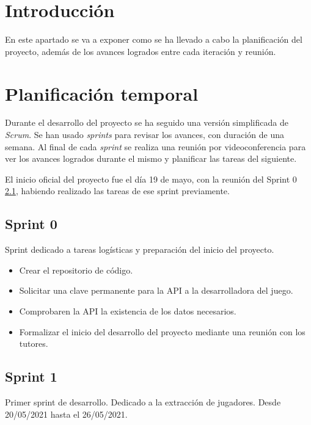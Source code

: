 
\section{Introducción}

En este apartado se va a exponer como se ha llevado a cabo la planificación del proyecto, además de los avances logrados entre cada iteración y reunión.

\section{Planificación temporal}

Durante el desarrollo del proyecto se ha seguido una versión simplificada de \textit{Scrum}. Se han usado \textit{sprints} para revisar los avances, con duración de una semana. Al final de cada \textit{sprint} se realiza una reunión por videoconferencia para ver los avances logrados durante el mismo y planificar las tareas del siguiente.

El inicio oficial del proyecto fue el día 19 de mayo, con la reunión del Sprint 0 \ref{sprint-0}, habiendo realizado las tareas de ese sprint previamente.

\subsection{Sprint 0}\label{sprint-0}

Sprint dedicado a tareas logísticas y preparación del inicio del proyecto.

\begin{itemize}
    \item Crear el repositorio de código.
    \item Solicitar una clave permanente para la API a la desarrolladora del juego.
    \item Comprobaren la API la existencia de los datos necesarios.
    \item Formalizar el inicio del desarrollo del proyecto mediante una reunión con los tutores.
\end{itemize}

\subsection{Sprint 1}

Primer sprint de desarrollo. Dedicado a la extracción de jugadores. Desde 20/05/2021 hasta el 26/05/2021.

